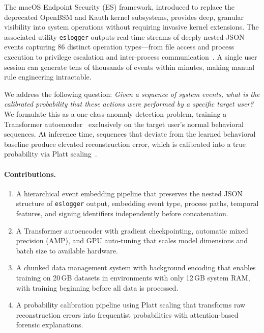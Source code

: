 \documentclass[letterpaper,twocolumn,10pt]{article}
\begin{document}
The macOS Endpoint Security (ES) framework, introduced to replace
the deprecated OpenBSM and Kauth kernel subsystems, provides deep,
granular visibility into system operations without requiring
invasive kernel extensions. The associated utility
\texttt{eslogger} outputs real-time streams of deeply nested JSON
events capturing 86 distinct operation types---from file access
and process execution to privilege escalation and inter-process
communication~\cite{apple_es}. A single user session can generate
tens of thousands of events within minutes, making manual rule
engineering intractable.

We address the following question: \emph{Given a sequence of system
events, what is the calibrated probability that these actions were
performed by a specific target user?} We formulate this as a
one-class anomaly detection problem, training a Transformer
autoencoder~\cite{vaswani} exclusively on the target user's normal
behavioral sequences. At inference time, sequences that deviate
from the learned behavioral baseline produce elevated
reconstruction error, which is calibrated into a true probability
via Platt scaling~\cite{platt}.

\paragraph{Contributions.}
\begin{enumerate}[nosep,leftmargin=*]
\item A hierarchical event embedding pipeline that preserves the
nested JSON structure of \texttt{eslogger} output, embedding
event type, process paths, temporal features, and signing
identifiers independently before concatenation.
\item A Transformer autoencoder with gradient checkpointing,
automatic mixed precision (AMP), and GPU auto-tuning that
scales model dimensions and batch size to available hardware.
\item A chunked data management system with background encoding
that enables training on 20\,GB datasets in environments with
only 12\,GB system RAM, with training beginning before all data
is processed.
\item A probability calibration pipeline using Platt scaling that
transforms raw reconstruction errors into frequentist
probabilities with attention-based forensic explanations.
\end{enumerate}

\end{document}
